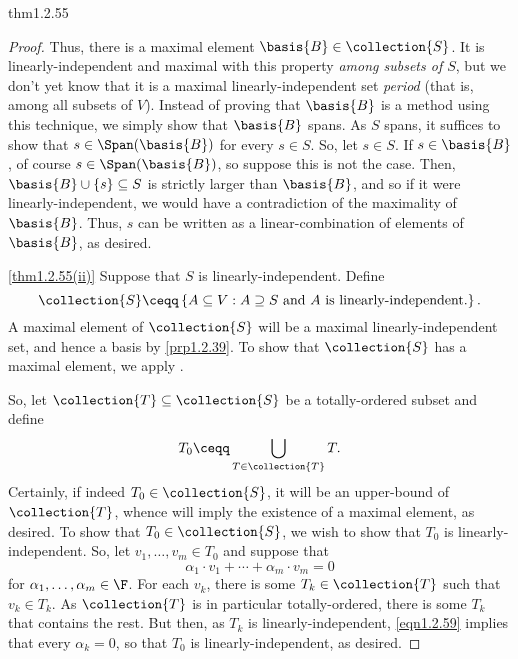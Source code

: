\begin{prp}{}{thm1.2.55}
\begin{proof}
		Thus, there is a maximal element $\basis{B}\in \collection{S}$.  It is linearly-independent and maximal with this property \emph{among subsets of $S$}, but we don't yet know that it is a maximal linearly-independent set \emph{period} (that is, among all subsets of $V$).  Instead of proving that $\basis{B}$ is a method using this technique, we simply show that $\basis{B}$ spans.  As $S$ spans, it suffices to show that $s\in \Span (\basis{B})$ for every $s\in S$.  So, let $s\in S$.  If $s\in \basis{B}$, of course $s\in \Span (\basis{B})$, so suppose this is not the case.  Then, $\basis{B}\cup \{ s\} \subseteq S$ is strictly larger than $\basis{B}$, and so if it were linearly-independent, we would have a contradiction of the maximality of $\basis{B}$.  Thus, $s$ can be written as a linear-combination of elements of $\basis{B}$, as desired.
		
		\blni
		\cref{thm1.2.55(ii)} Suppose that $S$ is linearly-independent.  Define
		\begin{equation*}
			\collection{S}\ceqq \left\{ A\subseteq V:A\supseteq S\text{ and }A\text{ is linearly-independent.}\right\} .
		\end{equation*}
		A maximal element of $\collection{S}$ will be a maximal linearly-independent set, and hence a basis by \cref{prp1.2.39}.  To show that $\collection{S}$ has a maximal element, we apply .
		
		So, let $\collection{T}\subseteq \collection{S}$ be a totally-ordered subset and define
		\begin{equation}
		T_0\ceqq \bigcup _{T\in \collection{T}}T.
		\end{equation}
		Certainly, if indeed $T_0\in \collection{S}$, it will be an upper-bound of $\collection{T}$, whence  will imply the existence of a maximal element, as desired.  To show that $T_0\in \collection{S}$, we wish to show that $T_0$ is linearly-independent.  So, let $v_1,\ldots ,v_m\in T_0$ and suppose that
		\begin{equation}\label{eqn1.2.59}
		\alpha _1\cdot v_1+\cdots +\alpha _m\cdot v_m=0
		\end{equation}
		for $\alpha _1,\ldots ,\alpha _m\in \F$.  For each $v_k$, there is some $T_k\in \collection{T}$ such that $v_k\in T_k$.  As $\collection{T}$ is in particular totally-ordered, there is some $T_k$ that contains the rest.  But then, as $T_k$ is linearly-independent, \eqref{eqn1.2.59} implies that every $\alpha _k=0$, so that $T_0$ is linearly-independent, as desired.
	\end{proof}
\end{prp}

